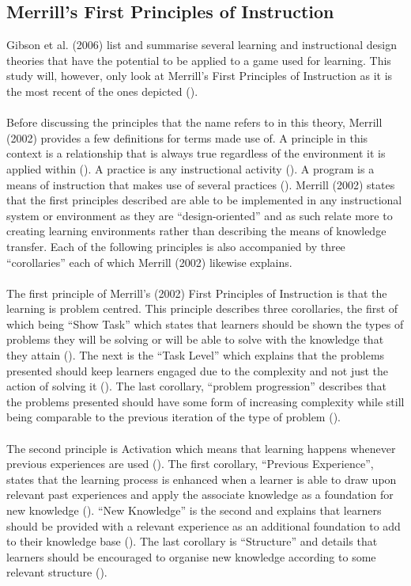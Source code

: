 \subsection{Merrill's First Principles of Instruction}
Gibson et al. (2006) list and summarise several learning and instructional design theories that have the potential to be applied to a game used for learning. This study will, however, only look at 	Merrill’s First Principles of Instruction as it is the most recent of the ones depicted (\cite{gibson2006games}).
\\\\
Before discussing the principles that the name refers to in this theory, Merrill (2002) provides a few definitions for terms made use of. A principle in this context is a relationship that is always true regardless of the environment it is applied within (\cite{Merrill2002}). A practice is any instructional activity (\cite{Merrill2002}). A program is a means of instruction that makes use of several practices (\cite{Merrill2002}). Merrill (2002) states that the first principles described are able to be implemented in any instructional system or environment as they are “design-oriented” and as such relate more to creating learning environments rather than describing the means of knowledge transfer. Each of the following principles is also accompanied by three “corollaries” each of which Merrill (2002) likewise explains.
\\\\
The first principle of Merrill’s (2002) First Principles of Instruction is that the learning is problem centred. This principle describes three corollaries, the first of which being “Show Task” which states that learners should be shown the types of problems they will be solving or will be able to solve with the knowledge that they attain (\cite{Merrill2002}). The next is the “Task Level” which explains that the problems presented should keep learners engaged due to the complexity and not just the action of solving it (\cite{Merrill2002}). The last corollary, “problem progression” describes that the problems presented should have some form of increasing complexity while still being comparable to the previous iteration of the type of problem (\cite{Merrill2002}).
\\\\
The second principle is Activation which means that learning happens whenever previous experiences are used (\cite{Merrill2002}). The first corollary, “Previous Experience”, states that the learning process is enhanced when a learner is able to draw upon relevant past experiences and apply the associate knowledge as a foundation for new knowledge (\cite{Merrill2002}). “New Knowledge” is the second and explains that learners should be provided with a relevant experience as an additional foundation to add to their knowledge base (\cite{Merrill2002}). The last corollary is “Structure” and details that learners should be encouraged to organise new knowledge according to some relevant structure (\cite{Merrill2002}).
